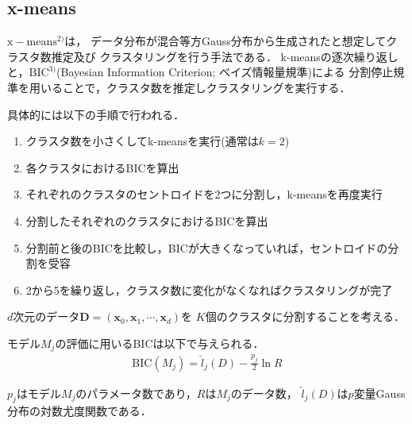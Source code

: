 \documentclass[10pt,a4j,twocolumn]{ltjsarticle}
\begin{document}
\subsection{x-means}
$\mathrm{x-means}^{2)}$は，
データ分布が混合等方Gauss分布から生成されたと想定してクラスタ数推定及び
クラスタリングを行う手法である．
k-meansの逐次繰り返しと，$\mathrm{BIC}^{3)}$(Bayesian Information Criterion; ベイズ情報量規準)による
分割停止規準を用いることで，クラスタ数を推定しクラスタリングを実行する．

具体的には以下の手順で行われる．
\begin{enumerate}
  \item クラスタ数を小さくしてk-meansを実行(通常は$k=2$)
  \item 各クラスタにおけるBICを算出
  \item それぞれのクラスタのセントロイドを2つに分割し，k-meansを再度実行
  \item 分割したそれぞれのクラスタにおけるBICを算出
  \item 分割前と後のBICを比較し，BICが大きくなっていれば，セントロイドの分割を受容
  \item 2から5を繰り返し，クラスタ数に変化がなくなればクラスタリングが完了
\end{enumerate}

$d$次元のデータ${\bm D}=({\bm x_0}, {\bm x_1}, \cdots, {\bm x_d})$を
$K$個のクラスタに分割することを考える．

モデル$M_j$の評価に用いるBICは以下で与えられる．
\begin{align}
  \label{eq:bic}
  \mathrm{BIC}(M_j) = \hat{l}_j(D) - \frac{p_j}{2}\ln R
\end{align}

$p_j$はモデル$M_j$のパラメータ数であり，$R$は$M_j$のデータ数，
$\hat{l}_j(D)$は$p$変量Gauss分布の対数尤度関数である．
\end{document}
